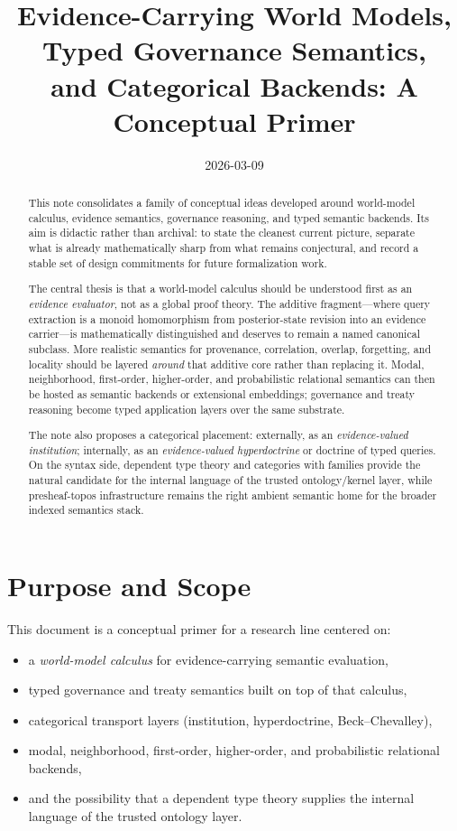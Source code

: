 \documentclass[11pt]{article}
\title{Evidence-Carrying World Models, Typed Governance Semantics,\\ and Categorical Backends: A Conceptual Primer}
\author{}
\date{2026-03-09}
\begin{document}
\maketitle

\begin{abstract}
This note consolidates a family of conceptual ideas developed around world-model
calculus, evidence semantics, governance reasoning, and typed semantic backends.
Its aim is didactic rather than archival: to state the cleanest current picture,
separate what is already mathematically sharp from what remains conjectural, and
record a stable set of design commitments for future formalization work.

The central thesis is that a world-model calculus should be understood first as
an \emph{evidence evaluator}, not as a global proof theory.  The additive
fragment---where query extraction is a monoid homomorphism from posterior-state
revision into an evidence carrier---is mathematically distinguished and deserves
to remain a named canonical subclass.  More realistic semantics for provenance,
correlation, overlap, forgetting, and locality should be layered \emph{around}
that additive core rather than replacing it.  Modal, neighborhood,
first-order, higher-order, and probabilistic relational semantics can then be
hosted as semantic backends or extensional embeddings; governance and treaty
reasoning become typed application layers over the same substrate.

The note also proposes a categorical placement: externally, as an
\emph{evidence-valued institution}; internally, as an
\emph{evidence-valued hyperdoctrine} or doctrine of typed queries.  On the
syntax side, dependent type theory and categories with families provide the
natural candidate for the internal language of the trusted ontology/kernel
layer, while presheaf-topos infrastructure remains the right ambient semantic
home for the broader indexed semantics stack.
\end{abstract}

\tableofcontents

\section{Purpose and Scope}

This document is a conceptual primer for a research line centered on:
\begin{itemize}
  \item a \emph{world-model calculus} for evidence-carrying semantic evaluation,
  \item typed governance and treaty semantics built on top of that calculus,
  \item categorical transport layers (institution, hyperdoctrine, Beck--Chevalley),
  \item modal, neighborhood, first-order, higher-order, and probabilistic
        relational backends,
  \item and the possibility that a dependent type theory supplies the internal
        language of the trusted ontology layer.
\end{itemize}
\end{document}
